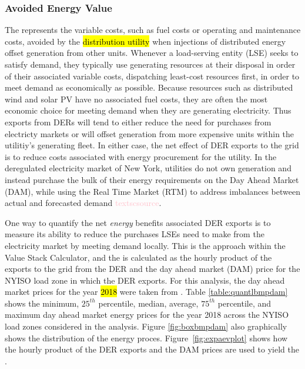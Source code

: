 \subsubsection{Avoided Energy Value}
\label{meth_val_aev}
The \aev{} represents the variable costs, such as fuel costs or operating and maintenance costs, avoided by the \hl{distribution utility} when injections of distributed energy offset generation from other units. Whenever a load-serving entity (LSE) seeks to satisfy demand, they typically use generating resources at their disposal in order of their associated variable costs, dispatching least-cost resources first, in order to meet demand as economically as possible. Because resources such as distributed wind and solar PV have no associated fuel costs, they are often the most economic choice for meeting demand when they are generating electricity. Thus exports from DERs will tend to either reduce the need for purchases from electricty markets or will offset generation from more expensive units within the utilitiy's generating fleet. In either case, the net effect of DER exports to the grid is to reduce costs associated with energy procurement for the utility. In the deregulated electricity market of New York, utilities do not own generation and instead purchase the bulk of their energy requirements on the Day Ahead Market (DAM), while using the Real Time Market (RTM) to address imbalances between actual and forecasted demand \textcolor{pink}{textsc{source}}. 

One way to quantify the net \textit{energy} benefits associated DER exports is to measure its ability to reduce the purchases LSEs need to make from the electricity market by meeting demand locally. This is the approach within the Value Stack Calculator, and the \aev{} is calculated as the hourly product of the exports to the grid from the DER and the day ahead market (DAM) price for the NYISO load zone in which the DER exports. For this analysis, the day ahead market prices for the year \hl{2018} were taken from \cite{nyiso_pricing_2020}. Table \ref{table:quantlbmpdam} shows the minimum, $25^{th}$ percentile, median, average, $75^{th}$ percentile, and maximum day ahead market energy prices for the year 2018 across the NYISO load zones considered in the analysis. Figure \ref{fig:boxbmpdam} also graphically shows the distribution of the energy proces. Figure~\ref{fig:expaevplot} shows how the hourly product of the DER exports and the DAM prices are used to yield the \aev{}. 


